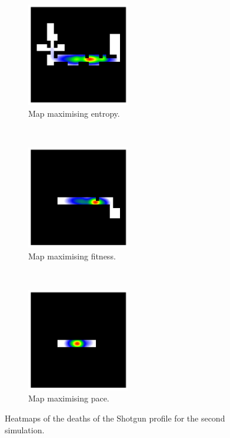\begin{figure}[H]
    \centering
    \begin{subfigure}[t]{0.3\textwidth}
        \centering
        \includegraphics[height=4.5cm]{Images/images/experiment_one/best_entropy_pop_1/deaths_bot_0.png}
        \caption{Map maximising entropy.}
    \end{subfigure}%
    ~ 
    \begin{subfigure}[t]{0.3\textwidth}
        \centering
        \includegraphics[height=4.5cm]{Images/images/experiment_one/best_fitness_pop_1/deaths_bot_0.png}
        \caption{Map maximising fitness.}
    \end{subfigure}
    ~ 
    \begin{subfigure}[t]{0.3\textwidth}
        \centering
        \includegraphics[height=4.5cm]{Images/images/experiment_one/best_pace_pop_1/deaths_bot_0.png}
        \caption{Map maximising pace.}
    \end{subfigure}
    \caption{Heatmaps of the deaths of the Shotgun profile for the second simulation.}
\end{figure}
